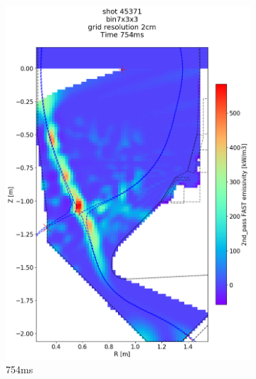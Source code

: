 \begin{figure}
\begin{subfigure}{0.395\linewidth}
         \includegraphics[trim={75 40 0 190},clip,width=\textwidth]{Chapters/chapter2/figs/IRVB-MASTU_shot-45371_export_10.png}
         \vspace*{-6.5mm}
         \caption{754ms}
         \label{fig:45371_export2_3}
     \end{subfigure}
     \begin{subfigure}{0.395\linewidth}
         \centering

\end{subfigure}
\end{figure}
